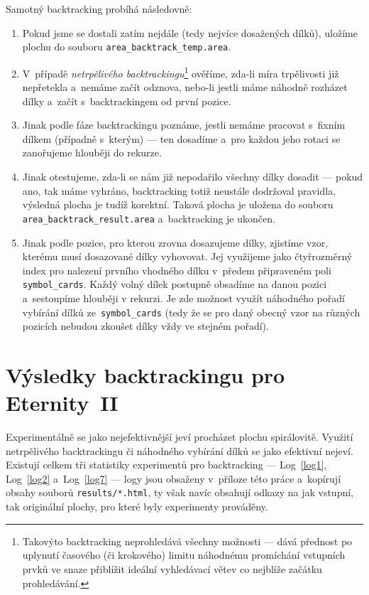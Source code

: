 \documentclass[11pt, titlepage]{report}
\begin{document}
Samotný backtracking probíhá následovně:
\begin{enumerate}
\item Pokud jsme se dostali zatím nejdále (tedy nejvíce dosažených dílků), uložíme plochu do souboru \texttt{area\_backtrack\_temp.area}.
\item V~případě \emph{netrpělivého backtrackingu}\footnote{Takovýto backtracking neprohledává všechny možnosti --- dává přednost po uplynutí časového (či krokového) limitu náhodnému promíchání vstupních prvků ve snaze přiblížit ideální vyhledávací větev co nejblíže začátku prohledávání.} ověříme, zda-li míra trpělivosti již nepřetekla a~nemáme začít odznova, nebo-li jestli máme náhodně rozházet dílky a~začít s~backtrackingem od první pozice.
\item Jinak podle fáze backtrackingu poznáme, jestli nemáme pracovat s~fixním dílkem (případně s~kterým) --- ten dosadíme a~pro každou jeho rotaci se zanořujeme hlouběji do rekurze.
\item Jinak otestujeme, zda-li se nám již nepodařilo všechny dílky dosadit --- pokud ano, tak máme vyhráno, backtracking totiž neustále dodržoval pravidla, výsledná plocha je tudíž korektní. Taková plocha je uložena do souboru \texttt{area\_backtrack\_result.area} a~backtracking je ukončen.
\item Jinak podle pozice, pro kterou zrovna dosazujeme dílky, zjistíme vzor, kterému musí dosazované dílky vyhovovat. Jej využijeme jako čtyřrozměrný index pro nalezení prvního vhodného dílku v~předem připraveném poli \texttt{symbol\_cards}. Každý volný dílek postupně obsadíme na danou pozici a~sestoupíme hlouběji v rekurzi. Je zde možnost využít náhodného pořadí vybírání dílků ze~\texttt{symbol\_cards} (tedy že se pro daný obecný vzor na různých pozicích nebudou zkoušet dílky vždy ve stejném pořadí).
\end{enumerate}

\section{Výsledky backtrackingu pro Eternity~II}
\label{sec:bck-vysl}

Experimentálně se jako nejefektivnější jeví procházet plochu spirálovitě. Využití netrpělivého backtrackingu či náhodného vybírání dílků se jako efektivní nejeví. Existují celkem tři statistiky experimentů pro backtracking --- Log~\ref{log1}, Log~\ref{log2} a~Log~\ref{log7} --- logy jsou obsaženy v~příloze této práce a~kopírují obsahy souborů \texttt{results/*.html}, ty však navíc obsahují odkazy na jak vstupní, tak originální plochy, pro které byly experimenty prováděny.
\end{document}
